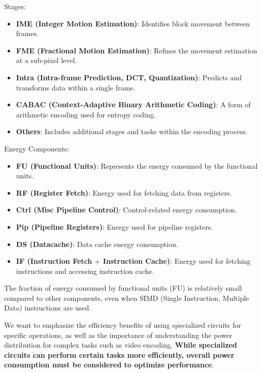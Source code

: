 \begin{examplebox}
    Stages:
    \begin{itemize}
        \item \textbf{IME (Integer Motion Estimation)}: Identifies block movement between frames.
        \item \textbf{FME (Fractional Motion Estimation)}: Refines the movement estimation at a sub-pixel level.
        \item \textbf{Intra (Intra-frame Prediction, DCT, Quantization)}: Predicts and transforms data within a single frame.
        \item \textbf{CABAC (Context-Adaptive Binary Arithmetic Coding)}: A form of arithmetic encoding used for entropy coding.
        \item \textbf{Others}: Includes additional stages and tasks within the encoding process.
    \end{itemize}
    Energy Components:
    \begin{itemize}
        \item \textbf{FU (Functional Units)}: Represents the energy consumed by the functional units.
        \item \textbf{RF (Register Fetch)}: Energy used for fetching data from registers.
        \item \textbf{Ctrl (Misc Pipeline Control)}: Control-related energy consumption.
        \item \textbf{Pip (Pipeline Registers)}: Energy used for pipeline registers.
        \item \textbf{DS (Datacache)}: Data cache energy consumption.
        \item \textbf{IF (Instruction Fetch $+$ Instruction Cache)}: Energy used for fetching instructions and accessing instruction cache.
    \end{itemize}
    The fraction of energy consumed by functional units (FU) is relatively small compared to other components, even when SIMD (Single Instruction, Multiple Data) instructions are used.

    \highspace
    We want to emphasize the efficiency benefits of using specialized circuits for specific operations, as well as the importance of understanding the power distribution for complex tasks such as video encoding. \textbf{While specialized circuits can perform certain tasks more efficiently, overall power consumption must be considered to optimize performance}.
\end{examplebox}

\newpage

